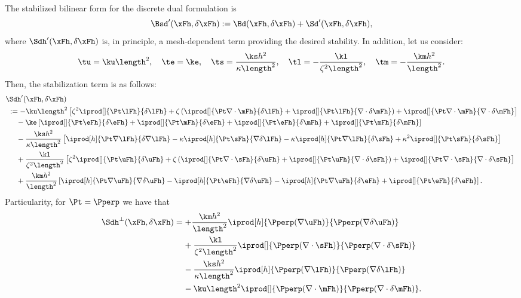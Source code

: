 The stabilized bilinear form for the discrete dual formulation is
$$
\Bsd'(\xFh,\delta\xFh) := 
\Bd(\xFh,\delta\xFh)+\Sd'(\xFh,\delta\xFh), 
$$
where $\Sdh'(\xFh, \delta\xFh)$ is, in principle, a mesh-dependent term providing the desired stability. In addition, let us consider:
$$
    \tu = \ku\length^2,\quad
    \te = \ke,\quad
    \ts = \frac{\ks h^2}{\kappa\length^2},\quad
    \tl = -\frac{\kl}{\zeta^2\length^2},\quad
    \tm = -\frac{\km h^2}{\length^2}.
$$
Then, the stabilization term is as follows:
\begin{align*}
& \Sdh'(\xFh,\delta\xFh)\\
&~ :=-\ku \length^2\left[\zeta^2\iprod[]{\Pt\lFh}{\delta\lFh}+\zeta\left(\iprod[]{\Pt\nabla\cdot\mFh}{\delta\lFh}+\iprod[]{\Pt\lFh}{\nabla\cdot\delta\mFh}\right)+\iprod[]{\Pt\nabla\cdot\mFh}{\nabla\cdot\delta\mFh}\right]\\
&\quad\:\:-\ke\left[\iprod[]{\Pt\eFh}{\delta\eFh}+\iprod[]{\Pt\mFh}{\delta\eFh}+\iprod[]{\Pt\eFh}{\delta \mFh}+\iprod[]{\Pt\mFh}{\delta\mFh}\right]\\
&\quad\:\:-\frac{\ks h^2}{\kappa\length^2}\left[\iprod[h]{\Pt\nabla\lFh}{\delta\nabla\lFh}-\kappa\iprod[h]{\Pt\sFh}{\nabla\delta\lFh}-\kappa\iprod[h]{\Pt\nabla\lFh}{\delta\sFh}+\kappa^2\iprod[]{\Pt\sFh}{\delta\sFh}\right]\\
&\quad\:\:+\frac{\kl}{\zeta^2\length^2}\left[\zeta^2\iprod[]{\Pt\uFh}{\delta\uFh}+\zeta\left(\iprod[]{\Pt\nabla\cdot\sFh}{\delta\uFh}+\iprod[]{\Pt\uFh}{\nabla\cdot\delta\sFh}\right)+\iprod[]{\Pt\nabla\cdot\sFh}{\nabla\cdot\delta\sFh}\right]\\
&\quad\:\:+\frac{\km h^2}{\length^2}\left[\iprod[h]{\Pt\nabla\uFh}{\nabla\delta\uFh}-
\iprod[h]{\Pt\eFh}{\nabla\delta\uFh}-\iprod[h]{\Pt\nabla\uFh}{\delta\eFh}+\iprod[]{\Pt\eFh}{\delta\eFh}\right]. 
\end{align*}
Particularity, for $\Pt = \Pperp$ we have that
\begin{align*}
\Sdh^\perp(\xFh,\delta\xFh)
&= +\frac{\km h^2}{\length^2}\iprod[h]{\Pperp(\nabla\uFh)}{\Pperp(\nabla\delta\uFh)}\\
&\:\:\:\:\:
+\frac{\kl}{\zeta^2\length^2}\iprod[]{\Pperp(\nabla\cdot\sFh)}{\Pperp(\nabla\cdot\delta\sFh)}\\
&\:\:\:\:\:-\frac{\ks h^2}{\kappa\length^2}\iprod[h]{\Pperp(\nabla\lFh)}{\Pperp(\nabla\delta\lFh)}\\
&\:\:\:\:\:
-\ku\length^2\iprod[]{\Pperp(\nabla\cdot\mFh)}{\Pperp(\nabla\cdot\delta\mFh)}.
\end{align*}

